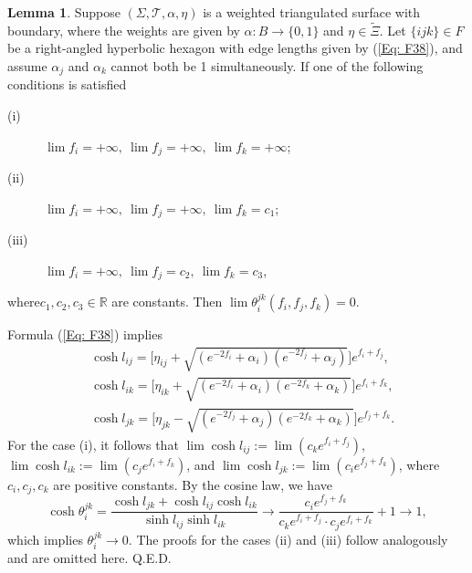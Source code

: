 \documentclass[12pt]{amsart}
\theoremstyle{definition}
\newtheorem{lemma}[theorem]{Lemma}
\def\qed{\hfill{Q.E.D.}\smallskip}
\begin{document}
\begin{lemma}\label{Lem: limit d1}
Suppose $(\Sigma,\mathcal{T},\alpha,\eta)$ is a weighted triangulated surface with boundary, where the weights are given by $\alpha: B\rightarrow \{0,1\}$ and $\eta\in \widetilde{\Xi}$.
Let $\{ijk\}\in F$ be a right-angled hyperbolic  hexagon with edge lengths given by (\ref{Eq: F38}), and assume $\alpha_j$ and $\alpha_k$ cannot both be 1 simultaneously.
If one of the following conditions is satisfied
\begin{description}
\item[(i)] $\lim f_i=+\infty,\ \lim f_j=+\infty,\ \lim f_k=+\infty$;
\item[(ii)] $\lim f_i=+\infty,\ \lim f_j=+\infty,\ \lim f_k=c_1$;
\item[(iii)] $\lim f_i=+\infty,\ \lim f_j=c_2,\ \lim f_k=c_3$,
\end{description}
where$c_1,c_2,c_3\in \mathbb{R}$ are constants.
Then $\lim\theta^{jk}_i(f_i,f_j,f_k)=0$.
\end{lemma}
\proof
Formula (\ref{Eq: F38}) implies
\begin{equation}\label{Eq: F3}
\begin{aligned}
&\cosh l_{ij}=\bigg[\eta_{ij}+\sqrt{(e^{-2f_i}+\alpha_i)
(e^{-2f_j}+\alpha_j)}\bigg]e^{f_i+f_j},\\
&\cosh l_{ik}=\bigg[\eta_{ik}+\sqrt{(e^{-2f_i}+\alpha_i)
(e^{-2f_k}+\alpha_k)}\bigg]e^{f_i+f_k},\\
&\cosh l_{jk}=\bigg[\eta_{jk}-\sqrt{(e^{-2f_j}+\alpha_j)
(e^{-2f_k}+\alpha_k)}\bigg]e^{f_j+f_k}.
\end{aligned}
\end{equation}
For the case (i), it follows that $\lim\cosh l_{ij}:=\lim (c_ke^{f_i+f_j})$, $\lim\cosh l_{ik}:=\lim (c_je^{f_i+f_k})$, and $\lim\cosh l_{jk}:=\lim (c_ie^{f_j+f_k})$, 
where $c_i,c_j,c_k$ are positive constants.
By the cosine law, we have
\begin{equation*}
\cosh \theta^{jk}_i=\frac{\cosh l_{jk}+\cosh l_{ij}\cosh l_{ik}}{\sinh l_{ij}\sinh l_{ik}}\rightarrow
\frac{c_ie^{f_j+f_k}}{c_ke^{f_i+f_j}\cdot c_je^{f_i+f_k}}+1
\rightarrow 1,
\end{equation*}
which implies $\theta^{jk}_i\rightarrow 0$.
The proofs for the cases (ii) and (iii) follow analogously and are omitted here.
\qed
\end{document}
